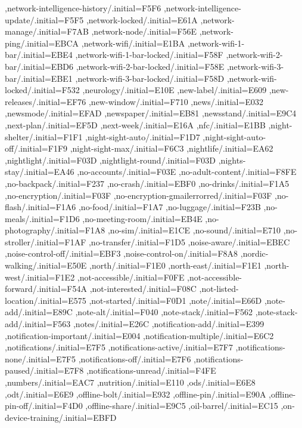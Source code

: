 { ,network-intelligence-history/.initial=F5F6
 ,network-intelligence-update/.initial=F5F5
 ,network-locked/.initial=E61A
 ,network-manage/.initial=F7AB
 ,network-node/.initial=F56E
 ,network-ping/.initial=EBCA
 ,network-wifi/.initial=E1BA
 ,network-wifi-1-bar/.initial=EBE4
 ,network-wifi-1-bar-locked/.initial=F58F
 ,network-wifi-2-bar/.initial=EBD6
 ,network-wifi-2-bar-locked/.initial=F58E
 ,network-wifi-3-bar/.initial=EBE1
 ,network-wifi-3-bar-locked/.initial=F58D
 ,network-wifi-locked/.initial=F532
 ,neurology/.initial=E10E
 ,new-label/.initial=E609
 ,new-releases/.initial=EF76
 ,new-window/.initial=F710
 ,news/.initial=E032
 ,newsmode/.initial=EFAD
 ,newspaper/.initial=EB81
 ,newsstand/.initial=E9C4
 ,next-plan/.initial=EF5D
 ,next-week/.initial=E16A
 ,nfc/.initial=E1BB
 ,night-shelter/.initial=F1F1
 ,night-sight-auto/.initial=F1D7
 ,night-sight-auto-off/.initial=F1F9
 ,night-sight-max/.initial=F6C3
 ,nightlife/.initial=EA62
 ,nightlight/.initial=F03D
 ,nightlight-round/.initial=F03D
 ,nights-stay/.initial=EA46
 ,no-accounts/.initial=F03E
 ,no-adult-content/.initial=F8FE
 ,no-backpack/.initial=F237
 ,no-crash/.initial=EBF0
 ,no-drinks/.initial=F1A5
 ,no-encryption/.initial=F03F
 ,no-encryption-gmailerrorred/.initial=F03F
 ,no-flash/.initial=F1A6
 ,no-food/.initial=F1A7
 ,no-luggage/.initial=F23B
 ,no-meals/.initial=F1D6
 ,no-meeting-room/.initial=EB4E
 ,no-photography/.initial=F1A8
 ,no-sim/.initial=E1CE
 ,no-sound/.initial=E710
 ,no-stroller/.initial=F1AF
 ,no-transfer/.initial=F1D5
 ,noise-aware/.initial=EBEC
 ,noise-control-off/.initial=EBF3
 ,noise-control-on/.initial=F8A8
 ,nordic-walking/.initial=E50E
 ,north/.initial=F1E0
 ,north-east/.initial=F1E1
 ,north-west/.initial=F1E2
 ,not-accessible/.initial=F0FE
 ,not-accessible-forward/.initial=F54A
 ,not-interested/.initial=F08C
 ,not-listed-location/.initial=E575
 ,not-started/.initial=F0D1
 ,note/.initial=E66D
 ,note-add/.initial=E89C
 ,note-alt/.initial=F040
 ,note-stack/.initial=F562
 ,note-stack-add/.initial=F563
 ,notes/.initial=E26C
 ,notification-add/.initial=E399
 ,notification-important/.initial=E004
 ,notification-multiple/.initial=E6C2
 ,notifications/.initial=E7F5
 ,notifications-active/.initial=E7F7
 ,notifications-none/.initial=E7F5
 ,notifications-off/.initial=E7F6
 ,notifications-paused/.initial=E7F8
 ,notifications-unread/.initial=F4FE
 ,numbers/.initial=EAC7
 ,nutrition/.initial=E110
 ,ods/.initial=E6E8
 ,odt/.initial=E6E9
 ,offline-bolt/.initial=E932
 ,offline-pin/.initial=E90A
 ,offline-pin-off/.initial=F4D0
 ,offline-share/.initial=E9C5
 ,oil-barrel/.initial=EC15
 ,on-device-training/.initial=EBFD
}
